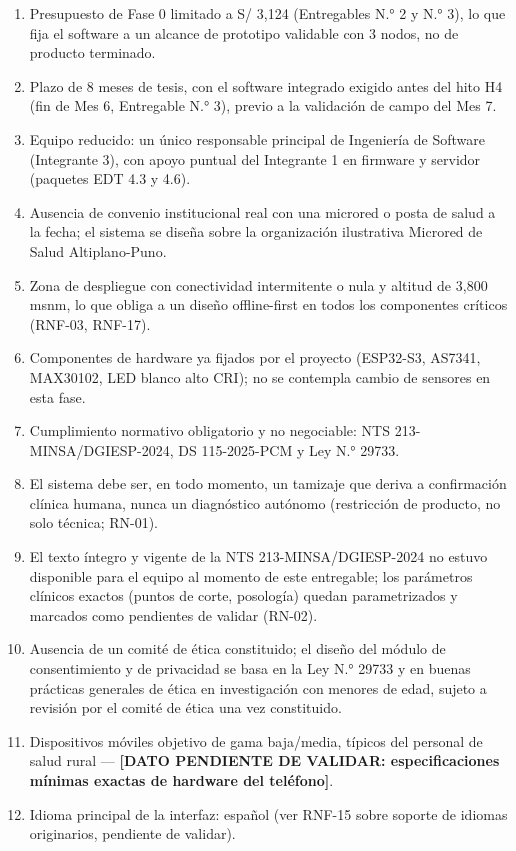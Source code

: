 \documentclass[11pt,a4paper]{article}
\providecommand{\tightlist}{%
  \setlength{\itemsep}{0pt}\setlength{\parskip}{0pt}}
\begin{document}
\begin{enumerate}
\def\labelenumi{\arabic{enumi}.}
\tightlist
\item
  Presupuesto de Fase 0 limitado a S/ 3,124 (Entregables N.° 2 y N.° 3), lo que fija el software a un alcance de prototipo validable con 3 nodos, no de producto terminado.
\item
  Plazo de 8 meses de tesis, con el software integrado exigido antes del hito H4 (fin de Mes 6, Entregable N.° 3), previo a la validación de campo del Mes 7.
\item
  Equipo reducido: un único responsable principal de Ingeniería de Software (Integrante 3), con apoyo puntual del Integrante 1 en firmware y servidor (paquetes EDT 4.3 y 4.6).
\item
  Ausencia de convenio institucional real con una microred o posta de salud a la fecha; el sistema se diseña sobre la organización ilustrativa Microred de Salud Altiplano-Puno.
\item
  Zona de despliegue con conectividad intermitente o nula y altitud de 3,800 msnm, lo que obliga a un diseño offline-first en todos los componentes críticos (RNF-03, RNF-17).
\item
  Componentes de hardware ya fijados por el proyecto (ESP32-S3, AS7341, MAX30102, LED blanco alto CRI); no se contempla cambio de sensores en esta fase.
\item
  Cumplimiento normativo obligatorio y no negociable: NTS 213-MINSA/DGIESP-2024, DS 115-2025-PCM y Ley N.° 29733.
\item
  El sistema debe ser, en todo momento, un tamizaje que deriva a confirmación clínica humana, nunca un diagnóstico autónomo (restricción de producto, no solo técnica; RN-01).
\item
  El texto íntegro y vigente de la NTS 213-MINSA/DGIESP-2024 no estuvo disponible para el equipo al momento de este entregable; los parámetros clínicos exactos (puntos de corte, posología) quedan parametrizados y marcados como pendientes de validar (RN-02).
\item
  Ausencia de un comité de ética constituido; el diseño del módulo de consentimiento y de privacidad se basa en la Ley N.° 29733 y en buenas prácticas generales de ética en investigación con menores de edad, sujeto a revisión por el comité de ética una vez constituido.
\item
  Dispositivos móviles objetivo de gama baja/media, típicos del personal de salud rural --- \textbf{{[}DATO PENDIENTE DE VALIDAR: especificaciones mínimas exactas de hardware del teléfono{]}}.
\item
  Idioma principal de la interfaz: español (ver RNF-15 sobre soporte de idiomas originarios, pendiente de validar).
\end{enumerate}
\end{document}
